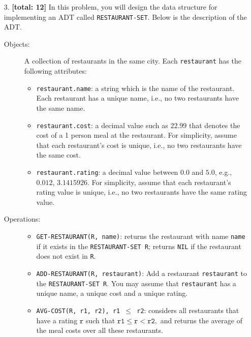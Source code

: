 \documentclass{assignment-263}
\begin{document}
\begin{enumerate}
\item[3.] \textbf{[total: 12]} In this problem, you will design the data
  structure for implementing an ADT called
  \texttt{RESTAURANT-SET}. Below is the description of the ADT.
  \begin{description}
  \item[Objects:] A collection of restaurants in the same city. Each
    \texttt{restaurant} has the following attributes:
    \begin{itemize}
    \item \texttt{restaurant.name}: a string which is the name of the
      restaurant. Each restaurant has a unique name, i.e., no two
      restaurants have the same name.
    \item \texttt{restaurant.cost}: a decimal value such as $22.99$
      that denotes the cost of a 1 person meal at the restaurant.  For
      simplicity, assume that each restaurant's cost is unique,
      i.e., no two restaurants have the same cost.
    \item \texttt{restaurant.rating}: a decimal value between $0.0$ and
      $5.0$, e.g., $0.012$, $3.1415926$. For simplicity, assume that
      each restaurant's rating value is unique, i.e., no two
      restaurants have the same rating value.
    \end{itemize}
  \item[Operations:] \mbox{}
    \begin{itemize}
    \item \texttt{GET-RESTAURANT(R, name)}: returns the restaurant
      with name \texttt{name} if it exists in the
      \texttt{RESTAURANT-SET R}; returns \texttt{NIL} if the restaurant
      does not exist in \texttt{R}.
    \item \texttt{ADD-RESTAURANT(R, restaurant)}: Add a restaurant
      \texttt{restaurant} to the \texttt{RESTAURANT-SET R}. You may
      assume that \texttt{restaurant} has a unique name, a unique
      cost and a unique rating.
    \item \texttt{AVG-COST(R, r1, r2),\ r1 $\le$ r2}: considers all
      restaurants that have a rating $\texttt{r}$ such that
      $\texttt{r1} \le \texttt{r} < \texttt{r2},$ and returns the
      average of the meal costs over all these restaurants.


\end{itemize}
\end{description}
\end{enumerate}
\end{document}
